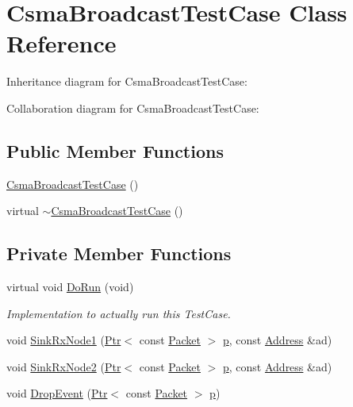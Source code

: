 \hypertarget{classCsmaBroadcastTestCase}{}\section{Csma\+Broadcast\+Test\+Case Class Reference}
\label{classCsmaBroadcastTestCase}


Inheritance diagram for Csma\+Broadcast\+Test\+Case\+:


Collaboration diagram for Csma\+Broadcast\+Test\+Case\+:
\subsection*{Public Member Functions}
\begin{DoxyCompactItemize}
\item 
\hyperlink{classCsmaBroadcastTestCase_a1bb2df8ffa5f00cc7ef1d2219a3d361f}{Csma\+Broadcast\+Test\+Case} ()
\item 
virtual \hyperlink{classCsmaBroadcastTestCase_a107b1f7022d1a09b4df9fc61bc18b5cd}{$\sim$\+Csma\+Broadcast\+Test\+Case} ()
\end{DoxyCompactItemize}
\subsection*{Private Member Functions}
\begin{DoxyCompactItemize}
\item 
virtual void \hyperlink{classCsmaBroadcastTestCase_a7627bd73126abea431bd84a676e43471}{Do\+Run} (void)
\begin{DoxyCompactList}\small\item\em Implementation to actually run this Test\+Case. \end{DoxyCompactList}\item 
void \hyperlink{classCsmaBroadcastTestCase_a8cd28720badbe50c9c08c8319dc0cf2e}{Sink\+Rx\+Node1} (\hyperlink{classns3_1_1Ptr}{Ptr}$<$ const \hyperlink{classns3_1_1Packet}{Packet} $>$ \hyperlink{lte__link__budget__x2__handover__measures_8m_ac9de518908a968428863f829398a4e62}{p}, const \hyperlink{classns3_1_1Address}{Address} \&ad)
\item 
void \hyperlink{classCsmaBroadcastTestCase_a9c89138bed50714662c95b0bd120ada0}{Sink\+Rx\+Node2} (\hyperlink{classns3_1_1Ptr}{Ptr}$<$ const \hyperlink{classns3_1_1Packet}{Packet} $>$ \hyperlink{lte__link__budget__x2__handover__measures_8m_ac9de518908a968428863f829398a4e62}{p}, const \hyperlink{classns3_1_1Address}{Address} \&ad)
\item 
void \hyperlink{classCsmaBroadcastTestCase_a8c8066824512eef292b1ec6d81e223ff}{Drop\+Event} (\hyperlink{classns3_1_1Ptr}{Ptr}$<$ const \hyperlink{classns3_1_1Packet}{Packet} $>$ \hyperlink{lte__link__budget__x2__handover__measures_8m_ac9de518908a968428863f829398a4e62}{p})
\end{DoxyCompactItemize}
